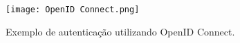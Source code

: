 
\begin{figure}[ht]
    \centering
    \texttt{[image: OpenID Connect.png]}
    \caption{Exemplo de autenticação utilizando OpenID Connect.}
    \label{fig:OpenID}
\end{figure}